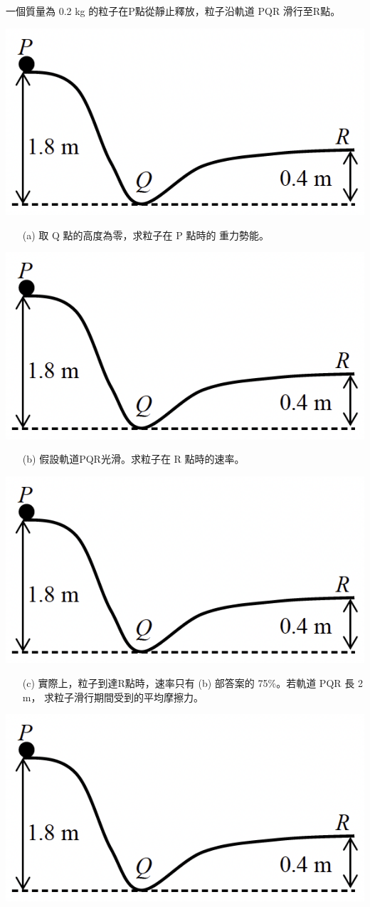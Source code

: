 \documentclass[beamer=true]{standalone}
\begin{document}
\begin{eg}
    一個質量為 0.2 kg 的粒子在P點從靜止釋放，粒子沿軌道 PQR 滑行至R點。
    {\par\centering
    \includegraphics[width=.4\textwidth]{assets/047b1413.png}
    \par}

\end{eg}

\begin{eg}
    \begin{itemize}
        \item [(a)]取 Q 點的高度為零，求粒子在 P 點時的 重力勢能。
    \end{itemize}{\par\raggedleft
    \includegraphics[width=.4\textwidth]{assets/047b1413.png}
    \par}
\end{eg}

\begin{eg}
    \begin{itemize}
        \item [(b)] 假設軌道PQR光滑。求粒子在 R 點時的速率。
    \end{itemize}{\par\raggedleft
    \includegraphics[width=.4\textwidth]{assets/047b1413.png}
    \par}
\end{eg}

\begin{eg}
    \begin{itemize}
        \item[(c)] 實際上，粒子到達R點時，速率只有 (b) 部答案的 75\%。若軌道 PQR 長 2 m， 求粒子滑行期間受到的平均摩擦力。
    \end{itemize}{\par\raggedleft
    \includegraphics[width=.4\textwidth]{assets/047b1413.png}
    \par}
\end{eg}
\end{document}
